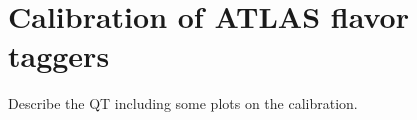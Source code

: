 \chapter{Calibration of ATLAS flavor taggers}
\label{chap:ftagcalib}

Describe the QT including some plots on the calibration.
